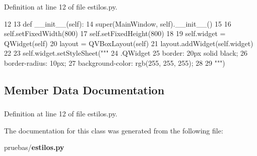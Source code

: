 \-Definition at line 12 of file estilos.\-py.


\begin{DoxyCode}
12 
13     def __init__(self):
14         super(MainWindow, self).__init__()
15 
16         self.setFixedWidth(800)
17         self.setFixedHeight(800)
18 
19         self.widget = QWidget(self)
20         layout = QVBoxLayout(self)
21         layout.addWidget(self.widget)
22         
23         self.widget.setStyleSheet("""
24         .QWidget {
25             border: 20px solid black;
26             border-radius: 10px;
27             background-color: rgb(255, 255, 255);
28             }
29         """)
        
\end{DoxyCode}


\subsection{\-Member \-Data \-Documentation}
\subsubsection[{widget}]{}\label{classpruebas_1_1estilos_1_1_main_window_af70f34db95495aaebeaaf27542031d75}


\-Definition at line 12 of file estilos.\-py.



\-The documentation for this class was generated from the following file\-:\begin{DoxyCompactItemize}
\item 
pruebas/{\bf estilos.\-py}\end{DoxyCompactItemize}
